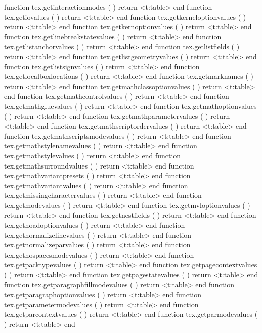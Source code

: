 function tex.getinteractionmodes           ( ) return <t:table> end
function tex.getiovalues                   ( ) return <t:table> end
function tex.getkerneloptionvalues         ( ) return <t:table> end
function tex.getkernoptionvalues           ( ) return <t:table> end
function tex.getlinebreakstatevalues       ( ) return <t:table> end
function tex.getlistanchorvalues           ( ) return <t:table> end
function tex.getlistfields                 ( ) return <t:table> end
function tex.getlistgeometryvalues         ( ) return <t:table> end
function tex.getlistsignvalues             ( ) return <t:table> end
function tex.getlocalboxlocations          ( ) return <t:table> end
function tex.getmarknames                  ( ) return <t:table> end
function tex.getmathclassoptionvalues      ( ) return <t:table> end
function tex.getmathcontrolvalues          ( ) return <t:table> end
function tex.getmathgluevalues             ( ) return <t:table> end
function tex.getmathoptionvalues           ( ) return <t:table> end
function tex.getmathparametervalues        ( ) return <t:table> end
function tex.getmathscriptordervalues      ( ) return <t:table> end
function tex.getmathscriptsmodevalues      ( ) return <t:table> end
function tex.getmathstylenamevalues        ( ) return <t:table> end
function tex.getmathstylevalues            ( ) return <t:table> end
function tex.getmathsurroundvalues         ( ) return <t:table> end
function tex.getmathvariantpresets         ( ) return <t:table> end
function tex.getmathvariantvalues          ( ) return <t:table> end
function tex.getmissingcharactervalues     ( ) return <t:table> end
function tex.getmodevalues                 ( ) return <t:table> end
function tex.getmvloptionvalues            ( ) return <t:table> end
function tex.getnestfields                 ( ) return <t:table> end
function tex.getnoadoptionvalues           ( ) return <t:table> end
function tex.getnormalizelinevalues        ( ) return <t:table> end
function tex.getnormalizeparvalues         ( ) return <t:table> end
function tex.getnospacesmodevalues         ( ) return <t:table> end
function tex.getpacktypevalues             ( ) return <t:table> end
function tex.getpagecontextvalues          ( ) return <t:table> end
function tex.getpagestatevalues            ( ) return <t:table> end
function tex.getparagraphfillmodevalues    ( ) return <t:table> end
function tex.getparagraphoptionvalues      ( ) return <t:table> end
function tex.getparametermodevalues        ( ) return <t:table> end
function tex.getparcontextvalues           ( ) return <t:table> end
function tex.getparmodevalues              ( ) return <t:table> end
